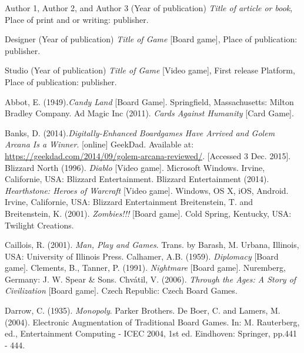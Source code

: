 \documentclass[a4paper,11pt]{report}
\begin{document}
\pagebreak
%
\begin{thebibliography}{1}

Author 1, Author 2, and Author 3 (Year of publication) \emph{Title of article or book}, Place of print and or writing: publisher.

Designer (Year of publication) \emph{Title of Game} [Board game], Place of publication: publisher.

Studio (Year of publication) \emph{Title of Game} [Video game],  First release Platform, Place of publication: publisher.

Abbot, E. (1949).\textit{Candy Land} [Board Game]. Springfield, Massachusetts: Milton Bradley Company.
Ad Magic Inc (2011). \textit{Cards Against Humanity} [Card Game].

Banks, D. (2014).\textit{Digitally-Enhanced Boardgames Have Arrived and Golem Arcana Is a Winner}. [online] GeekDad. Available at: \url{https://geekdad.com/2014/09/golem-arcana-reviewed/}. [Accessed 3 Dec. 2015].
Blizzard North (1996). \textit{Diablo} [Video game]. Microsoft Windows. Irvine, Californie, USA: Blizzard Entertainment.
Blizzard Entertainment (2014). \textit{Hearthstone: Heroes of Warcraft} [Video game]. Windows, OS X, iOS, Android.  Irvine, Californie, USA: Blizzard Entertainment
Breitenstein, T. and Breitenstein, K. (2001). \textit{Zombies!!!} [Board game]. Cold Spring, Kentucky, USA: Twilight Creations.

Caillois, R. (2001). \textit{Man, Play and Games}. Trans. by Barash, M. Urbana, Illinois, USA: University of Illinois Press.
Calhamer, A.B. (1959). \textit{Diplomacy} [Board game].
Clements, B., Tanner, P. (1991). \textit{Nightmare} [Board game]. Nuremberg, Germany: J. W. Spear \& Sons.
Chvátil, V. (2006). \textit{Through the Ages: A Story of Civilization} [Board game]. Czech Republic: Czech Board Games.

Darrow, C. (1935). \textit{Monopoly}. Parker Brothers.
De Boer, C. and Lamers, M. (2004). Electronic Augmentation of Traditional Board Games. In: M. Rauterberg, ed., Entertainment Computing - ICEC 2004, 1st ed. Eindhoven: Springer, pp.441 - 444.


\end{thebibliography}
\end{document}
